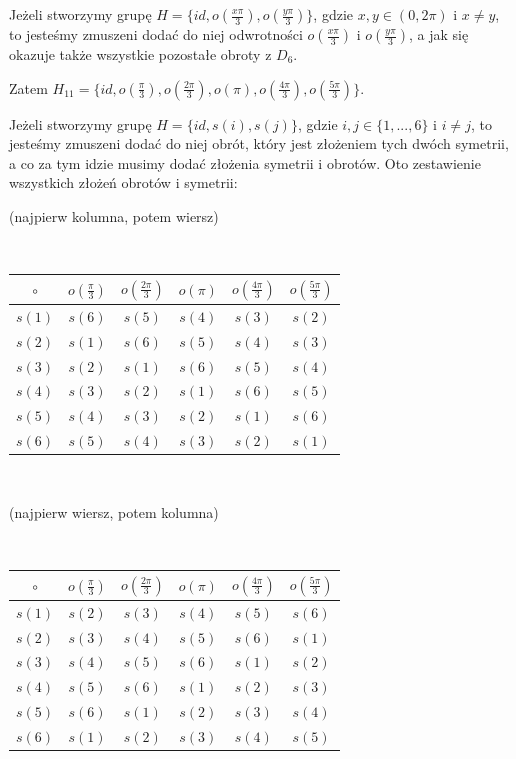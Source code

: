 \documentclass{article}
\begin{document}
Jeżeli stworzymy grupę $H=\{id,o(\frac{x\pi}{3}),o(\frac{y\pi}{3})\}$, gdzie $x,y\in (0,2\pi)$ i $x\neq y$, to jesteśmy zmuszeni dodać do niej odwrotności $o(\frac{x\pi}{3})$ i $o(\frac{y\pi}{3})$, a jak się okazuje także wszystkie pozostałe obroty z $D_6$. 

Zatem $H_{11}=\{id, o(\frac{\pi}{3}), o(\frac{2\pi}{3}), o(\pi), o(\frac{4\pi}{3}), o(\frac{5\pi}{3})\}$.

Jeżeli stworzymy grupę $H=\{id, s(i), s(j)\}$, gdzie $i,j\in \{1,...,6\}$ i $i\neq j$, to jesteśmy zmuszeni dodać do niej obrót, który jest złożeniem tych dwóch symetrii, a co za tym idzie musimy dodać złożenia symetrii i obrotów. Oto zestawienie wszystkich złożeń obrotów i symetrii:



\begin{center}
(najpierw kolumna, potem wiersz)

\ 

\begin{tabular}{c|c c c c c}
$\circ$  & $o(\frac{\pi}{3})$ & $o(\frac{2\pi}{3})$ & $o(\pi)$ & $o(\frac{4\pi}{3})$ & $o(\frac{5\pi}{3})$ \\\hline
$s(1)$ & $s(6)$ & $s(5)$ & $s(4)$ & $s(3)$ & $s(2)$  \\
$s(2)$ & $s(1)$ & $s(6)$ & $s(5)$ & $s(4)$ & $s(3)$  \\
$s(3)$ & $s(2)$ & $s(1)$ & $s(6)$ & $s(5)$ & $s(4)$  \\
$s(4)$ & $s(3)$ & $s(2)$ & $s(1)$ & $s(6)$ & $s(5)$  \\
$s(5)$ & $s(4)$ & $s(3)$ & $s(2)$ & $s(1)$ & $s(6)$  \\
$s(6)$ & $s(5)$ & $s(4)$ & $s(3)$ & $s(2)$ & $s(1)$ 
\end{tabular}

\ 

(najpierw wiersz, potem kolumna)

\ 

\begin{tabular}{c|c c c c c}


$\circ$  & $o(\frac{\pi}{3})$ & $o(\frac{2\pi}{3})$ & $o(\pi)$ & $o(\frac{4\pi}{3})$ & $o(\frac{5\pi}{3})$ \\\hline
$s(1)$ & $s(2)$ & $s(3)$ & $s(4)$ & $s(5)$ & $s(6)$  \\
$s(2)$ & $s(3)$ & $s(4)$ & $s(5)$ & $s(6)$ & $s(1)$  \\
$s(3)$ & $s(4)$ & $s(5)$ & $s(6)$ & $s(1)$ & $s(2)$  \\
$s(4)$ & $s(5)$ & $s(6)$ & $s(1)$ & $s(2)$ & $s(3)$  \\
$s(5)$ & $s(6)$ & $s(1)$ & $s(2)$ & $s(3)$ & $s(4)$  \\
$s(6)$ & $s(1)$ & $s(2)$ & $s(3)$ & $s(4)$ & $s(5)$ 
\end{tabular}
\end{center}
\end{document}
